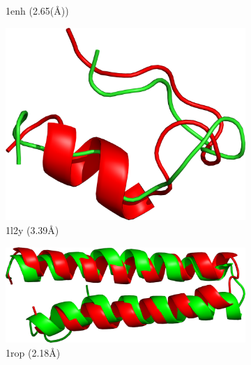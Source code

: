 \begin{figure}
\begin{subfigure}{0.24\linewidth}
    \caption{1enh (2.65(\AA))}
    \label{fig:1enh-conformation}
  \end{subfigure}
  \begin{subfigure}{0.32\linewidth}
    \centering
    \includegraphics[width=0.9\linewidth]{Figuras/prots/1l2y_render.png}
    \caption{1l2y (3.39\AA)}
    \label{fig:1l2y-conformation}
  \end{subfigure}
%
  \begin{subfigure}{0.32\linewidth}
    \centering
    \includegraphics[width=0.9\linewidth]{Figuras/prots/1rop_render.png}
    \caption{1rop (2.18\AA)}
    \label{fig:1rop-conformation}
  \end{subfigure}
%
  \begin{subfigure}{0.32\linewidth}
    \centering

\end{subfigure}
\end{figure}
